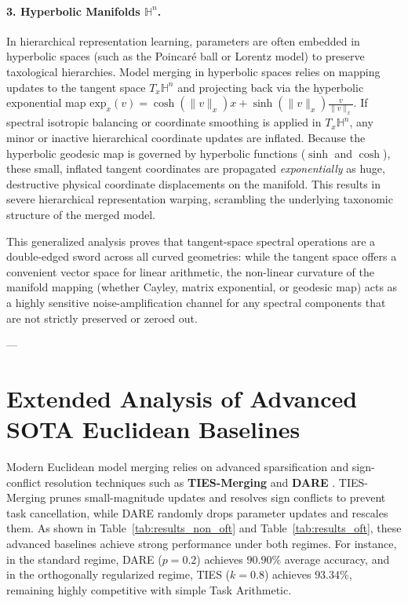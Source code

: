 \paragraph{3. Hyperbolic Manifolds $\mathbb{H}^n$.}
In hierarchical representation learning, parameters are often embedded in hyperbolic spaces (such as the Poincaré ball or Lorentz model) to preserve taxological hierarchies. Model merging in hyperbolic spaces relies on mapping updates to the tangent space $T_x \mathbb{H}^n$ and projecting back via the hyperbolic exponential map $\mathrm{exp}_x(v) = \cosh(\|v\|_x) x + \sinh(\|v\|_x) \frac{v}{\|v\|_x}$.
If spectral isotropic balancing or coordinate smoothing is applied in $T_x \mathbb{H}^n$, any minor or inactive hierarchical coordinate updates are inflated. Because the hyperbolic geodesic map is governed by hyperbolic functions ($\sinh$ and $\cosh$), these small, inflated tangent coordinates are propagated \emph{exponentially} as huge, destructive physical coordinate displacements on the manifold. This results in severe hierarchical representation warping, scrambling the underlying taxonomic structure of the merged model.

This generalized analysis proves that tangent-space spectral operations are a double-edged sword across all curved geometries: while the tangent space offers a convenient vector space for linear arithmetic, the non-linear curvature of the manifold mapping (whether Cayley, matrix exponential, or geodesic map) acts as a highly sensitive noise-amplification channel for any spectral components that are not strictly preserved or zeroed out.

---

\section{Extended Analysis of Advanced SOTA Euclidean Baselines}
\label{sec:appendix_sota_baselines}

Modern Euclidean model merging relies on advanced sparsification and sign-conflict resolution techniques such as \textbf{TIES-Merging} \cite{ties2023} and \textbf{DARE} \cite{dare2024}. TIES-Merging prunes small-magnitude updates and resolves sign conflicts to prevent task cancellation, while DARE randomly drops parameter updates and rescales them. As shown in Table~\ref{tab:results_non_oft} and Table~\ref{tab:results_oft}, these advanced baselines achieve strong performance under both regimes. For instance, in the standard regime, DARE ($p=0.2$) achieves $90.90\%$ average accuracy, and in the orthogonally regularized regime, TIES ($k=0.8$) achieves $93.34\%$, remaining highly competitive with simple Task Arithmetic. 

